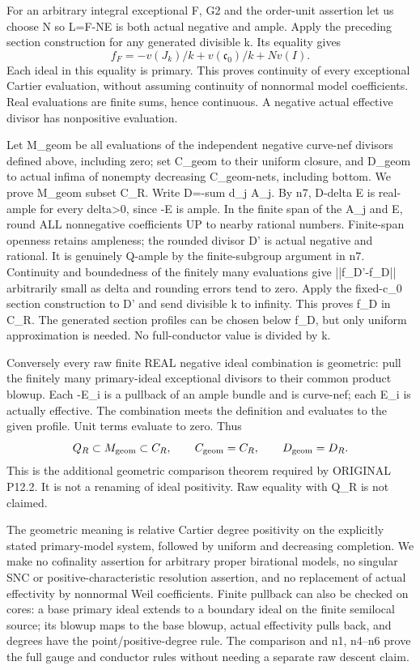 \documentclass[11pt]{article}
\begin{document}
For an arbitrary integral exceptional F, G2 and the order-unit assertion let us choose N so L=F-NE is both actual negative and ample. Apply the preceding section construction for any generated divisible k. Its equality gives
\[
f_F=-v(J_k)/k+v(\mathfrak c_0)/k+Nv(I).
\]
Each ideal in this equality is primary. This proves continuity of every exceptional Cartier evaluation, without assuming continuity of nonnormal model coefficients. Real evaluations are finite sums, hence continuous. A negative actual effective divisor has nonpositive evaluation.

Let M\_geom be all evaluations of the independent negative curve-nef divisors defined above, including zero; set C\_geom to their uniform closure, and D\_geom to actual infima of nonempty decreasing C\_geom-nets, including bottom. We prove M\_geom subset C\_R. Write D=-sum d\_j A\_j. By n7, D-delta E is real-ample for every delta>0, since -E is ample. In the finite span of the A\_j and E, round ALL nonnegative coefficients UP to nearby rational numbers. Finite-span openness retains ampleness; the rounded divisor D' is actual negative and rational. It is genuinely Q-ample by the finite-subgroup argument in n7. Continuity and boundedness of the finitely many evaluations give ||f\_D'-f\_D|| arbitrarily small as delta and rounding errors tend to zero. Apply the fixed-c\_0 section construction to D' and send divisible k to infinity. This proves f\_D in C\_R. The generated section profiles can be chosen below f\_D, but only uniform approximation is needed. No full-conductor value is divided by k.

Conversely every raw finite REAL negative ideal combination is geometric: pull the finitely many primary-ideal exceptional divisors to their common product blowup. Each -E\_i is a pullback of an ample bundle and is curve-nef; each E\_i is actually effective. The combination meets the definition and evaluates to the given profile. Unit terms evaluate to zero. Thus
\[
Q_R\subset M_{\rm geom}\subset C_R,\qquad
C_{\rm geom}=C_R,\qquad D_{\rm geom}=D_R.
\]
This is the additional geometric comparison theorem required by ORIGINAL P12.2. It is not a renaming of ideal positivity. Raw equality with Q\_R is not claimed.

The geometric meaning is relative Cartier degree positivity on the explicitly stated primary-model system, followed by uniform and decreasing completion. We make no cofinality assertion for arbitrary proper birational models, no singular SNC or positive-characteristic resolution assertion, and no replacement of actual effectivity by nonnormal Weil coefficients. Finite pullback can also be checked on cores: a base primary ideal extends to a boundary ideal on the finite semilocal source; its blowup maps to the base blowup, actual effectivity pulls back, and degrees have the point/positive-degree rule. The comparison and n1, n4--n6 prove the full gauge and conductor rules without needing a separate raw descent claim.
\end{document}
